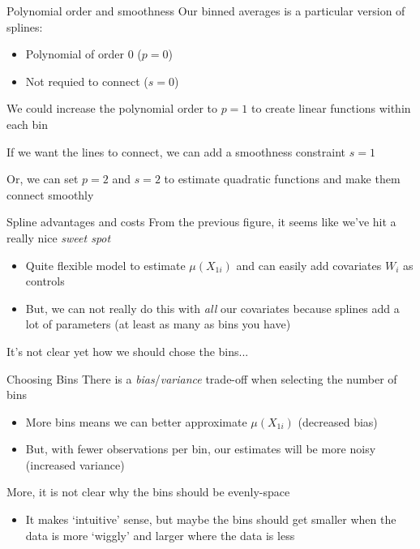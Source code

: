 \documentclass[aspectratio=169,t,11pt,table]{beamer}
\begin{document}


\begin{frame}{Polynomial order and smoothness}
  Our binned averages is a particular version of splines:
  \begin{itemize}
    \item Polynomial of order 0 ($p = 0$)
    \item Not requied to connect ($s = 0$)
  \end{itemize}

  \bigskip
  We could increase the polynomial order to $p = 1$ to create linear functions within each bin

  \bigskip
  If we want the lines to connect, we can add a smoothness constraint $s = 1$

  \bigskip
  Or, we can set $p = 2$ and $s = 2$ to estimate quadratic functions and make them connect smoothly
\end{frame}


\begin{frame}{Spline advantages and costs}
  From the previous figure, it seems like we've hit a really nice \emph{sweet spot}
  \begin{itemize}
    \item Quite flexible model to estimate $\mu(X_{1i})$ and can easily add covariates $W_i$ as controls
    
    \item But, we can not really do this with \emph{all} our covariates because splines add a lot of parameters (at least as many as bins you have)
  \end{itemize}

  \pause
  \bigskip
  It's not clear yet how we should chose the bins...
\end{frame}


\begin{frame}{Choosing Bins}
  There is a \emph{bias}/\emph{variance} trade-off when selecting the number of bins
  \begin{itemize}
    \item More bins means we can better approximate $\mu(X_{1i})$ (decreased bias)
    
    \item But, with fewer observations per bin, our estimates will be more noisy (increased variance)
  \end{itemize}

  \bigskip
  More, it is not clear why the bins should be evenly-space
  \begin{itemize}
    \item It makes `intuitive' sense, but maybe the bins should get smaller when the data is more `wiggly' and larger where the data is less
  \end{itemize}
\end{frame}
\end{document}

